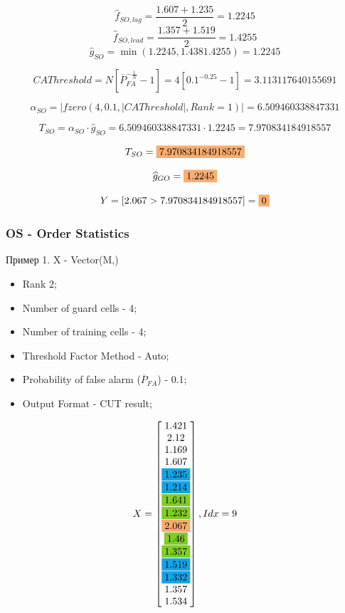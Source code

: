 \documentclass[a4paper,11pt]{article}
\begin{document}
			$$ \widehat{f}_{SO,lag} = \frac{1.607 + 1.235}{2} = 1.2245$$ 
			$$ \widehat{f}_{SO,lead} = \frac{1.357 + 1.519}{2} = 1.4255$$ 
			$$ \widehat{g}_{SO} = \min(1.2245, 1.4381.4255) = 1.2245$$
			
			$$ CAThreshold = N \left[\overline{P}_{FA}^{-\frac{1}{N}} - 1\right] = 4 \left[0.1^{-0.25} - 1\right] = 3.113117640155691$$
			
			$$ \alpha_{SO} = |fzero(4, 0.1, |CAThreshold|, Rank=1)| = 6.509460338847331$$
			
			$$ T_{SO} = \alpha_{SO}\cdot \widehat{g}_{SO} = 6.509460338847331 \cdot 1.2245 = 7.970834184918557$$
			
			\begin{framed}
				
				$$ T_{SO} =  \colorbox{Apricot}{7.970834184918557}$$
				
				$$ \widehat{g}_{GO} =  \colorbox{Apricot}{1.2245}$$ 
				
				$$ Y = [2.067 > 7.970834184918557] = \colorbox{Apricot}{0}$$
			\end{framed}
			
		\subsubsection{OS - Order Statistics}
			Пример 1. X - Vector(M,)
		
			\begin{itemize}
				\item Rank 2;
				\item Number of guard cells - 4; 
				\item Number of training cells - 4;
				\item Threshold Factor Method - Auto;
				\item Probability of false alarm ($\overline{P}_{FA}$) - 0.1;
				\item Output Format - CUT result;
			\end{itemize}
			
			$$X = 
			\begin{bmatrix}
				1.421\\
				2.12\\
				1.169\\
				1.607\\
				\colorbox{Cerulean}{1.235}\\
				\colorbox{Cerulean}{1.214}\\
				\colorbox{LimeGreen}{1.641}\\
				\colorbox{LimeGreen}{1.232}\\
				\colorbox{Apricot}{2.067}\\
				\colorbox{LimeGreen}{1.46}\\
				\colorbox{LimeGreen}{1.357}\\
				\colorbox{Cerulean}{1.519}\\
				\colorbox{Cerulean}{1.332}\\
				1.357\\
				1.534
			\end{bmatrix}, Idx = 9
			$$
			
\end{document}
